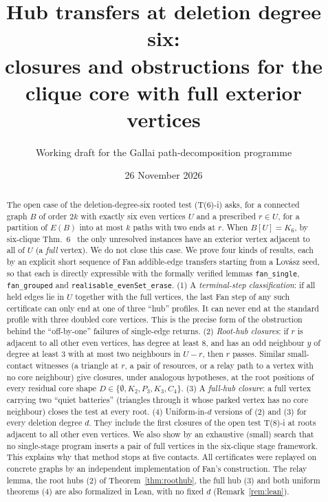 \documentclass[11pt]{amsart}
\title[Hub transfers at deletion degree six]{Hub transfers at deletion degree six:\\
closures and obstructions for the clique core with full exterior vertices}
\author{Working draft for the Gallai path-decomposition programme}
\date{26 November 2026}
\theoremstyle{definition}
\begin{document}
\begin{abstract}
The open case of the deletion-degree-six rooted test (T(6)-i) asks, for a connected graph $B$ of
order $2k$ with exactly six even vertices $U$ and a prescribed $r\in U$, for a partition of $E(B)$
into at most $k$ paths with two ends at $r$. When $B[U]=K_6$, by six-clique Thm.~6~\cite{6CL} the only unresolved
instances have an exterior vertex adjacent to all of $U$ (a \emph{full} vertex). We do not close this case. We prove
four kinds of results, each by an explicit short sequence of Fan addible-edge transfers starting
from a Lov\'asz seed, so that each is directly expressible with the formally verified lemmas
\texttt{fan\_single}, \texttt{fan\_grouped} and \texttt{realisable\_evenSet\_erase}.
(1) A \emph{terminal-step classification}: if all held edges lie in $U$ together with the full
vertices, the last Fan step of any such certificate can only end at one of three ``hub'' profiles.
It can never end at the standard profile with three doubled core vertices. This is the precise
form of the obstruction behind the ``off-by-one'' failures of single-edge returns.
(2) \emph{Root-hub closures}: if $r$ is adjacent to all other even vertices, has degree at least
$8$, and has an odd neighbour $y$ of degree at least $3$ with at most two neighbours in $U-r$, then
$r$ passes. Similar small-contact witnesses (a triangle at $r$, a pair of resources,
or a relay path to a vertex with no core neighbour) give closures, under analogous hypotheses, at
the root positions of every residual core shape $D\in\{\emptyset,K_2,P_3,K_3,C_4\}$.
(3) A \emph{full-hub closure}: a full vertex carrying two ``quiet batteries'' (triangles through
it whose parked vertex has no core neighbour) closes the test at every root.
(4) Uniform-in-$d$ versions of (2) and (3) for every deletion degree $d$. They include the first
closures of the open test T(8)-i at roots adjacent to all other even vertices.
We also show by an exhaustive (small) search that no single-stage program inserts a pair of full
vertices in the six-clique stage framework. This explains why that method stops at five contacts.
All certificates were replayed on concrete graphs by an independent implementation of Fan's
construction. The relay lemma, the root hubs (2) of Theorem~\ref{thm:roothub}, the full hub (3) and both
uniform theorems (4) are also formalized in Lean, with no fixed $d$ (Remark~\ref{rem:lean}).
\end{abstract}

\maketitle
\end{document}
